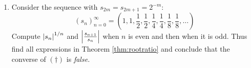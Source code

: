 \begin{exercises}{}{}
\begin{enumerate}
		\item Consider the sequence with $s_{2m}=s_{2m+1}=2^{-m}$:
		\[
			(s_n)_{n=0}^\infty
			=\left(1,1,\frac 12,\frac 12,\frac 14,\frac 14,\frac 18,\frac 18,\ldots\right)
		\]
		Compute $\left| s_n\right|^{1/n}$ and $\left| \frac{s_{n+1}}{s_n}\right|$ when $n$ is even and then when it is odd. Thus find all expressions in Theorem \ref{thm:rootratio} and conclude that the converse of $(\dag)$ is \emph{false.}


	\end{enumerate}
\end{exercises}

